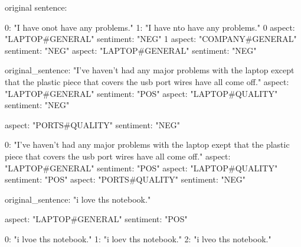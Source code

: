 original sentence: 

\begin{table}[]
\centering
{}
\caption{Results Misspelling}
\label{tab:my-table}
\end{table}

0: "I have onot have any problems."
1: "I have nto have any problems."
0
    aspect: "LAPTOP#GENERAL"
    sentiment: "NEG"
1
aspect: "COMPANY#GENERAL"
sentiment: "NEG"
aspect: "LAPTOP#GENERAL"
sentiment: "NEG"


original_sentence: "I've haven't had any major problems with the laptop except that the plastic piece that covers the usb port wires have all come off."
aspect: "LAPTOP#GENERAL"
sentiment: "POS"
aspect: "LAPTOP#QUALITY"
sentiment: "NEG"

    aspect: "PORTS#QUALITY"
    sentiment: "NEG"

0: "I've haven't had any major problems with the laptop exept that the plastic piece that covers the usb port wires have all come off."
aspect: "LAPTOP#GENERAL"
sentiment: "POS"
aspect: "LAPTOP#QUALITY"
sentiment: "POS"
aspect: "PORTS#QUALITY"
sentiment: "NEG"


original_sentence: "i love ths notebook."

    aspect: "LAPTOP#GENERAL"
    sentiment: "POS"

0: "i lvoe ths notebook."
1: "i loev ths notebook."
2: "i lveo ths notebook."


